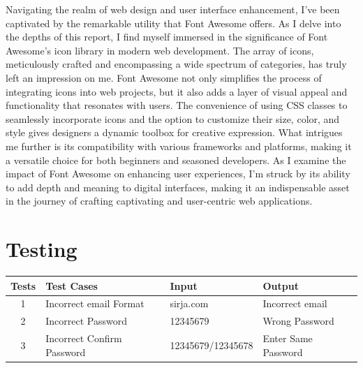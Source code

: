 \newline
Navigating the realm of web design and user interface enhancement, I've been captivated by the remarkable utility that Font Awesome offers. As I delve into the depths of this report, I find myself immersed in the significance of Font Awesome's icon library in modern web development. The array of icons, meticulously crafted and encompassing a wide spectrum of categories, has truly left an impression on me. Font Awesome not only simplifies the process of integrating icons into web projects, but it also adds a layer of visual appeal and functionality that resonates with users. The convenience of using CSS classes to seamlessly incorporate icons and the option to customize their size, color, and style gives designers a dynamic toolbox for creative expression. What intrigues me further is its compatibility with various frameworks and platforms, making it a versatile choice for both beginners and seasoned developers. As I examine the impact of Font Awesome on enhancing user experiences, I'm struck by its ability to add depth and meaning to digital interfaces, making it an indispensable asset in the journey of crafting captivating and user-centric web applications.

\section{Testing}
\begin{tabular}{|c|l|l|l|}
    \hline
    Tests & Test Cases & Input & Output \\
    \hline
        1 & Incorrect email Format & sirja.com & Incorrect email \\
        2 & Incorrect Password & 12345679 & Wrong Password \\
        3 & Incorrect Confirm Password & 12345679/12345678 & Enter Same Password \\
    \hline
\end{tabular}

